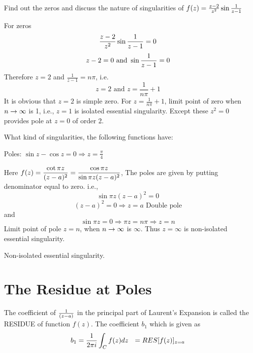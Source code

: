 \begin{problems}
	\prob  Find out the zeros and discuss the nature of singularities of $f(z)=\frac{z-2}{z^2}\sin{1 \over z-1}$
	\begin{sol}
	For zeros
	\[\frac{z-2}{z^2}\sin{1 \over z-1} = 0\]
	\[z-2 = 0 \text{ and } \sin{1 \over z-1} = 0\]
	Therefore $z=2$ and $\frac{1}{z-1}=n\pi$, i.e.
	\[z= 2 \text{ and } z=\frac{1}{n\pi}+1\]
	It is obvious that $z=2$ is simple zero. For $z=\frac{1}{n\pi}+1$, limit point of zero when $n\rightarrow \infty$ is 1, i.e., $z=1$ is isolated essential singularity. Except these $z^2=0$ provides pole at $z=0$ of order 2.
	\end{sol}
	\prob  What kind  of singularities, the following functions have:
	
	\begin{sol}
	Poles: $\sin z - \cos z=0 \Rightarrow z=\frac{\pi}{4}$
	\end{sol}
	\begin{sol}
	Here $\displaystyle f(z)=\frac{\cot \pi z}{(z-a)^2}=\frac{\cos \pi z}{\sin \pi z(z-a)^2}$, The poles are given by putting denominator equal to zero. i.e.,
	\[\sin \pi z(z-a)^2 = 0\]
	\[(z-a)^2 = 0 \Rightarrow z=a \text{ Double pole}\]
	and
	\[\sin \pi z = 0 \Rightarrow \pi z = n\pi \Rightarrow z=n\]
	Limit point of pole $z=n$, when $n\rightarrow \infty$ is $\infty$. Thus $z=\infty$ is non-isolated essential singularity.
	\end{sol}
		\begin{sol}
	Non-isolated essential singularity.
	\end{sol}									
	\end{problems}
	
	\section{The Residue at Poles}
	The coefficient of $1 \over (z-a)$ in the principal part of Laurent's Expansion is called the RESIDUE of function $f(z)$. The coefficient $b_1$ which is given as 
	\[b_1 = {1 \over 2\pi i} \int_C f(z) dz  ~~ = RES[f(z)]_{z=a}\]

